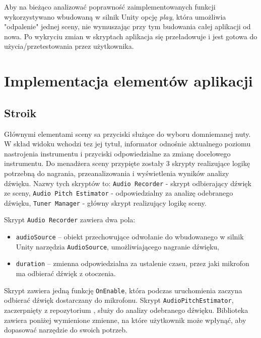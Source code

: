 Aby na bieżąco analizować poprawność zaimplementowanych funkcji wykorzystywano wbudowaną w silnik Unity opcję \emph{play}, która umożliwia "odpalenie" jednej sceny, nie wymuszając przy tym budowania całej aplikacji od nowa. Po wykryciu zmian w skryptach aplikacja się przeładowuje i jest gotowa do użycia/przetestowania przez użytkownika.

\section{Implementacja elementów aplikacji}

\subsection{Stroik}

Głównymi elementami sceny sa przyciski służące do wyboru domniemanej nuty. W skład widoku wchodzi tez jej tytuł, informator odnośnie aktualnego poziomu nastrojenia instrumentu i przyciski odpowiedzialne za zmianę docelowego instrumentu. Do menadżera sceny przypięte zostały 3 skrypty realizujące logikę potrzebną do nagrania, przeanalizowania i wyświetlenia wyników analizy dźwięku. Nazwy tych skryptów to: \texttt{Audio Recorder} - skrypt odbierający dźwięk ze sceny, \texttt{Audio Pitch Estimator} - odpowiedzialny za analizę odebranego dźwięku, \texttt{Tuner Manager} - główny skrypt realizujący logikę sceny. 

Skrypt \texttt{Audio Recorder} zawiera dwa pola:
\begin{itemize}
    \item \texttt{audioSource} -- obiekt przechowujące odwołanie do wbudowanego w silnik Unity narzędzia \texttt{AudioSource}, umożliwiającego nagranie dźwięku,
    \item \texttt{duration} -- zmienna odpowiedzialna za ustalenie czasu, przez jaki mikrofon ma odbierać dźwięk z otoczenia.
\end{itemize}

Skrypt zawiera jedną funkcję \texttt{OnEnable}, która podczas uruchomienia zaczyna odbierać dźwięk dostarczany do mikrofonu. Skrypt \texttt{AudioPitchEstimator}, zaczerpnięty z repozytorium \cite{https://github.com/nakakq/AudioPitchEstimatorForUnity}, %
służy do analizy odebranego dźwięku. Biblioteka zawiera poniżej wymienione zmienne, na które użytkownik może wpłynąć, aby dopasować narzędzie do swoich potrzeb.



